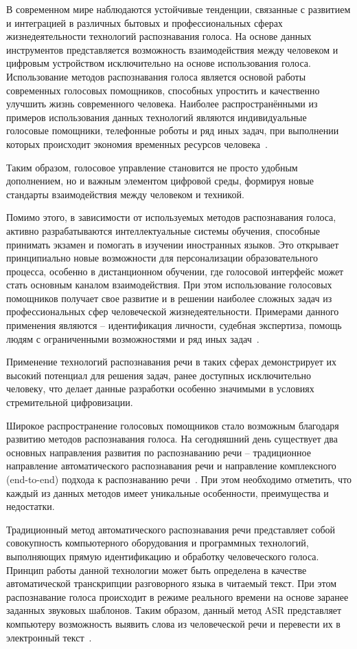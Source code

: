 В современном мире наблюдаются устойчивые тенденции, связанные с развитием и интеграцией в различных бытовых и профессиональных сферах жизнедеятельности технологий распознавания голоса. На основе данных инструментов представляется возможность взаимодействия между человеком и цифровым устройством исключительно на основе использования голоса. Использование методов распознавания голоса является основой работы современных голосовых помощников, способных упростить и качественно улучшить жизнь современного человека. Наиболее распространёнными из примеров использования данных технологий являются индивидуальные голосовые помощники, телефонные роботы и ряд иных задач, при выполнении которых происходит экономия временных ресурсов человека~\cite{Hein}.

Таким образом, голосовое управление становится не просто удобным дополнением, но и важным элементом цифровой среды, формируя новые стандарты взаимодействия между человеком и техникой.

Помимо этого, в зависимости от используемых методов распознавания голоса, активно разрабатываются интеллектуальные системы обучения, способные принимать экзамен и помогать в изучении иностранных языков.
Это открывает принципиально новые возможности для персонализации образовательного процесса, особенно в дистанционном обучении, где голосовой интерфейс может стать основным каналом взаимодействия.
При этом использование голосовых помощников получает свое развитие и в решении наиболее сложных задач из профессиональных сфер человеческой жизнедеятельности. Примерами данного применения являются – идентификация личности, судебная экспертиза, помощь людям с ограниченными возможностями и ряд иных задач~\cite{Muravyov}.

Применение технологий распознавания речи в таких сферах демонстрирует их высокий потенциал для решения задач, ранее доступных исключительно человеку, что делает данные разработки особенно значимыми в условиях стремительной цифровизации.

Широкое распространение голосовых помощников стало возможным благодаря развитию методов распознавания голоса. На сегодняшний день существует два основных направления развития по распознаванию речи – традиционное направление автоматического распознавания речи и направление комплексного (end-to-end) подхода к распознаванию речи~\cite{Riqiang}. При этом необходимо отметить, что каждый из данных методов имеет уникальные особенности, преимущества и недостатки.

Традиционный метод автоматического распознавания речи представляет собой совокупность компьютерного оборудования и программных технологий, выполняющих прямую идентификацию и обработку человеческого голоса. Принцип работы данной технологии может быть определена в качестве автоматической транскрипции разговорного языка в читаемый текст. При этом распознавание голоса происходит в режиме реального времени на основе заранее заданных звуковых шаблонов. Таким образом, данный метод ASR представляет компьютеру возможность выявить слова из человеческой речи и перевести их в электронный текст~\cite{Khlopenkova}.

